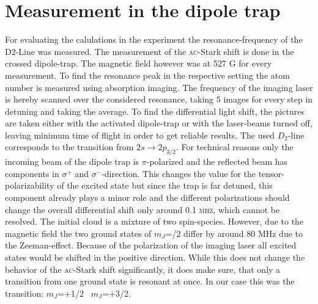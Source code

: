 \chapter{Measurement in the dipole trap}
For evaluating the calulations in the experiment the resonance-frequency of the D2-Line was measured. The measurement of the \textsc{ac}-Stark shift is done in the crossed dipole-trap. The magnetic field however was at 527 G for every measurement. To find the resonance peak in the respective setting the atom number is measured using absorption imaging. The frequency of the imaging laser is hereby scanned over the considered resonance, taking 5 images for every step in detuning and taking the average. To find the differential light shift, the pictures are taken either with the activated dipole-trap or with the laser-beams turned off, leaving minimum time of flight in order to get reliable results. The used $D_2$-line corresponds to the transition from  $2s\rightarrow2p_{3/2}$. For technical reasons only the incoming beam of the dipole trap is $\pi$-polarized and the reflected beam has components in \(\sigma^+\) and \(\sigma^-\)-direction. This changes the value for the tensor-polarizability of the excited state but since the trap is far detuned, this component already plays a minor role and the different polarizations should change the overall differential shift only around 0.1 \textsc{mhz}, which cannot be resolved. The initial cloud is a mixture of two spin-species. However, due to the magnetic field the two ground states of $m_J$=/2 differ by around 80 MHz due to the Zeeman-effect. Because of the polarization of the imaging laser all excited states would be shifted in the positive direction. While this does not change the behavior of the \textsc{ac}-Stark shift significantly, it does make sure, that only a transition from one ground state is resonant at once. In our case this was the transition: $m_J$=+1/2 \rightarrow\ $m_J$=+3/2. 
